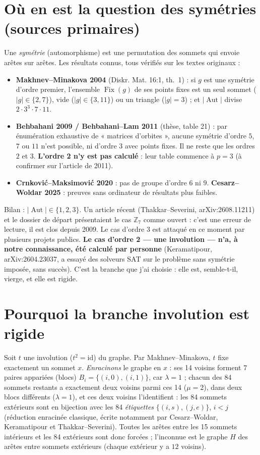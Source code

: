 \documentclass[11pt,a4paper]{article}
\theoremstyle{definition}
\theoremstyle{remark}
\newcommand{\Z}{\mathbb{Z}}
\newcommand{\Fix}{\operatorname{Fix}}
\newcommand{\Aut}{\operatorname{Aut}}
\begin{document}
\section{Où en est la question des symétries (sources primaires)}
Une \emph{symétrie} (automorphisme) est une permutation des sommets qui envoie arêtes sur arêtes. Les résultats connus, tous vérifiés sur les textes originaux :
\begin{itemize}[nosep]
\item \textbf{Makhnev--Minakova 2004} (Diskr. Mat. 16:1, th.~1) : si $g$ est une symétrie d'ordre premier, l'ensemble $\Fix(g)$ de ses points fixes est
  un seul sommet ($|g|\in\{2,7\}$), vide ($|g|\in\{3,11\}$) ou un triangle ($|g|=3$) ; et $|\Aut|$ divise $2\cdot3^3\cdot7\cdot11$.
\item \textbf{Behbahani 2009 / Behbahani--Lam 2011} (thèse, table 21) : par énumération exhaustive de « matrices d'orbites », aucune symétrie
  d'ordre $5$, $7$ ou $11$ n'est possible, ni d'ordre $3$ avec points fixes. Il ne reste que les ordres $2$ et $3$. \textbf{L'ordre 2 n'y est pas calculé} :
  leur table commence à $p=3$ (à confirmer sur l'article de 2011).
\item \textbf{Crnković--Maksimović 2020} : pas de groupe d'ordre $6$ ni $9$. \textbf{Cesarz--Woldar 2025} : preuves sans ordinateur de résultats plus faibles.
\end{itemize}
Bilan : $|\Aut|\in\{1,2,3\}$. Un article récent (Thakkar--Severini, ar\-Xiv:2608.11211) et le dossier de départ présentaient le cas $\Z_7$ comme ouvert :
c'est une erreur de lecture, il est clos depuis 2009. Le cas d'ordre 3 est attaqué en ce moment par plusieurs projets publics.
\textbf{Le cas d'ordre 2 --- une involution --- n'a, à notre connaissance, été calculé par personne} (Keramatipour, arXiv:2604.23037, a essayé des solveurs SAT sur le problème
sans symétrie imposée, sans succès). C'est la branche que j'ai choisie : elle est, semble-t-il, vierge, et elle est rigide.

\section{Pourquoi la branche involution est rigide}
Soit $t$ une involution ($t^2=\mathrm{id}$) du graphe. Par Makhnev--Minakova, $t$ fixe exactement un sommet $x$.
\emph{Enracinons} le graphe en $x$ : ses 14 voisins forment 7 paires appariées (blocs) $B_i=\{(i,0),(i,1)\}$, car $\lambda=1$ ; chacun des 84 sommets
restants a exactement deux voisins parmi ces 14 ($\mu=2$), dans deux blocs différents ($\lambda=1$), et ces deux voisins l'identifient : les 84 sommets extérieurs
sont en bijection avec les 84 \emph{étiquettes} $\{(i,s),(j,e)\}$, $i<j$ (réduction enracinée classique, écrite notamment par Cesarz--Woldar, Keramatipour et Thakkar--Severini). Toutes les arêtes entre les 15 sommets intérieurs
et les 84 extérieurs sont donc forcées ; l'inconnue est le graphe $H$ des arêtes entre sommets extérieurs (chaque extérieur y a $12$ voisins).
\end{document}
